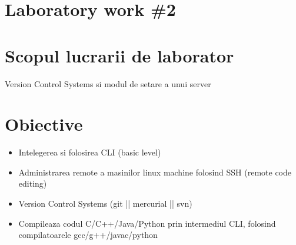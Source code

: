 \section*{Laboratory work \#2}

\section{Scopul lucrarii de laborator}
Version Control Systems si modul de setare a unui server
\section{Obiective}
\begin{itemize}
\item Intelegerea si folosirea CLI (basic level)
\item Administrarea remote a masinilor linux machine folosind SSH (remote code editing)
\item Version Control Systems (git || mercurial || svn)
\item Compileaza codul C/C++/Java/Python prin intermediul CLI, folosind compilatoarele gcc/g++/javac/python
\end{itemize}

\clearpage